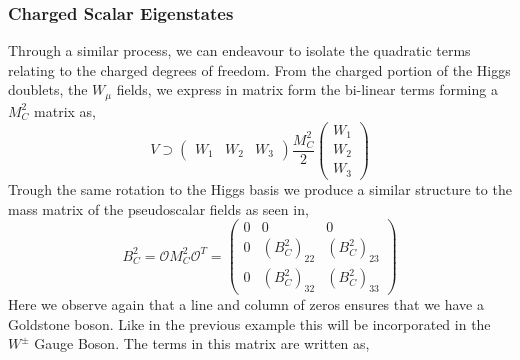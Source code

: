 \subsubsection{Charged Scalar Eigenstates}

Through a similar process, we can endeavour to isolate the quadratic terms relating to the charged degrees of freedom. From the charged portion of the Higgs doublets, the $W_\mu$ fields, we express in matrix form the bi-linear terms forming a $M_C^2$ matrix as, 
%
\begin{equation}
V \supset \left( \begin{array}{ccc} 
W_1 & W_2 & W_3 
\end{array} \right) 
\frac{M_C^2}{2} \left( \begin{array}{c}
W_1 \\ 
W_2 \\
W_3
\end{array} \right) 
\end{equation}
Trough the same rotation to the Higgs basis we produce a similar structure to the mass matrix of the pseudoscalar fields as seen in,  
%
%
\begin{equation}
\label{eq:3HDM_Charged_M1}
B^2_C = \mathcal{O} M_C^2 \mathcal{O}^T = \left( \begin{array}{ccc}
0 & 0 & 0 \\ 
0 & \left( B^2_C \right)_{22} &  \left( B^2_C \right)_{23} \\
0 & \left( B^2_C \right)_{32} &  \left( B^2_C \right)_{33}
\end{array} \right) 
\end{equation}
%
Here we observe again that a line and column of zeros ensures that we have a Goldstone boson. Like in the previous example this will be incorporated in the $W^\pm$ Gauge Boson. The terms in this matrix are written as,
%
%
%
